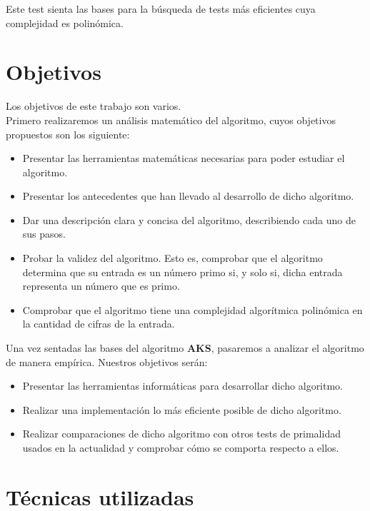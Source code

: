 Este test sienta las bases para la búsqueda de tests más eficientes cuya complejidad es polinómica.

\section{Objetivos}

Los objetivos de este trabajo son varios.\\

Primero realizaremos un análisis matemático del algoritmo, cuyos objetivos propuestos son los siguiente:

\begin{itemize}
	\item Presentar las herramientas matemáticas necesarias para poder estudiar el algoritmo.
	
	\item Presentar los antecedentes que han llevado al desarrollo de dicho algoritmo.
	
	\item Dar una descripción clara y concisa del algoritmo, describiendo cada uno de sus pasos.
	
	\item Probar la validez del algoritmo. Esto es, comprobar que el algoritmo determina que su entrada es un número primo si, y solo si, dicha entrada representa un número que es primo.
	
	\item Comprobar que el algoritmo tiene una complejidad algorítmica polinómica en la cantidad de cifras de la entrada.
\end{itemize}

Una vez sentadas las bases del algoritmo \textbf{AKS}, pasaremos a analizar el algoritmo de manera empírica. Nuestros objetivos serán:

\begin{itemize}
	\item Presentar las herramientas informáticas para desarrollar dicho algoritmo.
	
	\item Realizar una implementación lo más eficiente posible de dicho algoritmo.
	
	\item Realizar comparaciones de dicho algoritmo con otros tests de primalidad usados en la actualidad y comprobar cómo se comporta respecto a ellos.
\end{itemize}

\section{Técnicas utilizadas}

